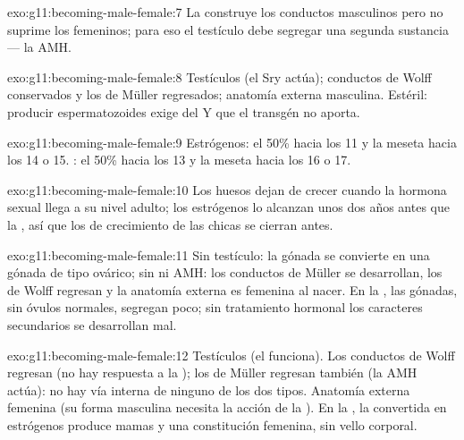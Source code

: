 \begin{solution}{exo:g11:becoming-male-female:7}
La  construye los conductos masculinos pero no suprime los
femeninos; para eso el testículo debe segregar una segunda sustancia
--- la AMH.
\end{solution}

\begin{solution}{exo:g11:becoming-male-female:8}
Testículos (el Sry actúa); conductos de Wolff conservados y los de
Müller regresados; anatomía externa masculina. Estéril: producir
espermatozoides exige  del Y que el transgén no aporta.
\end{solution}

\begin{solution}{exo:g11:becoming-male-female:9}
Estrógenos: el 50\% hacia los 11 y la meseta hacia los 14 o 15.
: el 50\% hacia los 13 y la meseta hacia los 16 o 17.
\end{solution}

\begin{solution}{exo:g11:becoming-male-female:10}
Los huesos dejan de crecer cuando la hormona sexual llega a su nivel
adulto; los estrógenos lo alcanzan unos dos años antes que la
, así que los  de crecimiento de las chicas se
cierran antes.
\end{solution}

\begin{solution}{exo:g11:becoming-male-female:11}
Sin testículo: la gónada se convierte en una gónada de tipo ovárico;
sin  ni AMH: los conductos de Müller se desarrollan, los de
Wolff regresan y la anatomía externa es femenina al nacer. En la
, las gónadas, sin óvulos normales, segregan poco; sin
tratamiento hormonal los caracteres secundarios se desarrollan mal.
\end{solution}

\begin{solution}{exo:g11:becoming-male-female:12}
Testículos (el  funciona). Los conductos de Wolff regresan (no hay
respuesta a la ); los de Müller regresan también (la AMH
actúa): no hay vía interna de ninguno de los dos tipos. Anatomía
externa femenina (su forma masculina necesita la acción de la
). En la , la  convertida en estrógenos
produce mamas y una constitución femenina, sin vello corporal.
\end{solution}

